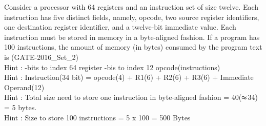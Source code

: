\begin{questyle}
  \question  Consider a processor with 64 registers and an instruction set of size twelve. Each
             instruction has five distinct fields, namely, opcode, two source register identifiers,
             one destination register identifier, and a twelve-bit immediate value. Each instruction
             must be stored in memory in a byte-aligned fashion. If a program has 100 instructions,
             the amount of memory (in bytes) consumed by the program text is \fillin[500] (GATE-2016\_Set\_2)
             \\ Hint : -bits to index 64 register -bis to index 12 opcode(instructions)
             \\ Hint : \quad Instruction(34 bit) = opcode(4) + R1(6) + R2(6) + R3(6) + Immediate Operand(12)
             \\ Hint : \quad Total size need to store one instruction in byte-aligned fashion = 40(\(\thickapprox\)34) = 5 bytes.
             \\ Hint : \quad Size to store 100 instructions = 5 x 100 = 500 Bytes
\end{questyle}


